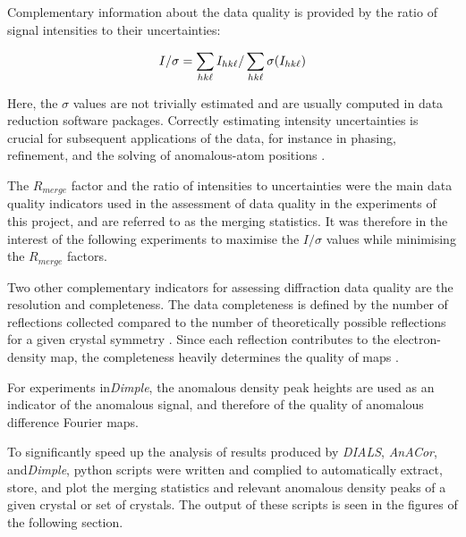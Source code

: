 Complementary information about the data quality is provided by the ratio of signal intensities to their uncertainties:

\begin{equation}
    I / \sigma = \sum_{hk\ell} I_{hk\ell}/\sum_{hk\ell} \sigma(I_{hk\ell})
\end{equation}

Here, the $\sigma$ values are not trivially estimated and are usually computed in data reduction software packages. Correctly estimating intensity uncertainties is crucial for subsequent applications of the data, for instance in phasing, refinement, and the solving of anomalous-atom positions \cite{Dauter1999}.  

The $R_{merge}$ factor and the ratio of intensities to uncertainties were the main data quality indicators used in the assessment of data quality in the experiments of this project, and are referred to as the merging statistics. It was therefore in the interest of the following experiments to maximise the $I / \sigma$ values while minimising the $R_{merge}$ factors. %

Two other complementary indicators for assessing diffraction data quality are the resolution and completeness. The data completeness is defined by the number of reflections collected compared to the number of theoretically possible reflections for a given crystal symmetry \cite{Arkhipova2017}. %
Since each reflection contributes to the electron-density map, the completeness heavily determines the quality of maps \cite{Wlodawer2007}.

For experiments in\textit{Dimple}, the anomalous density peak heights are used as an indicator of the anomalous signal, and therefore of the quality of anomalous difference Fourier maps.

To significantly speed up the analysis of results produced by \textit{DIALS}, \textit{AnACor}, and\textit{Dimple}, python scripts were written and complied to automatically extract, store, and plot the merging statistics and relevant anomalous density peaks of a given crystal or set of crystals. The output of these scripts is seen in the figures of the following section.